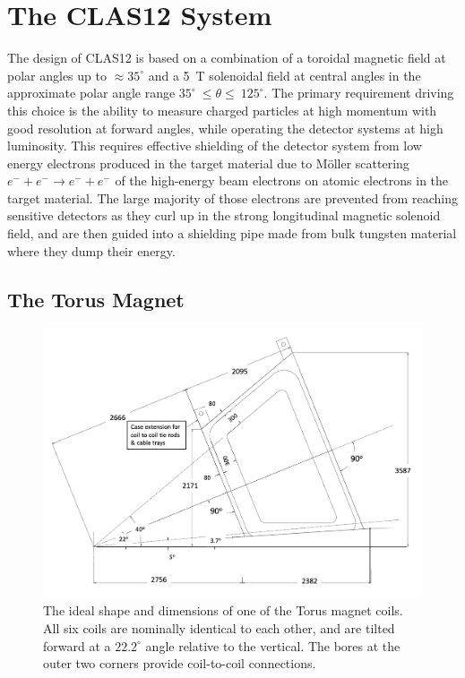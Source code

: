 \documentclass[final,3p,twocolumn]{elsarticle}
\begin{document}
\section{The CLAS12 System}

The design of CLAS12 is based on a combination of a toroidal magnetic field at polar angles up to $\approx 35^\circ$ and
a 5~T solenoidal field at central angles in the approximate polar angle range $35^\circ~\le \theta \le~125^\circ$. The
primary requirement driving this choice is the ability to measure charged particles at high momentum with good resolution
at forward angles, while operating the detector systems at high luminosity. This requires effective shielding of the
detector system from low energy electrons produced in the target material due to M\"oller scattering
$e^- + e^- \to e^- + e^-$ of the high-energy beam electrons on atomic electrons in the target material. The large majority
of those electrons are prevented from reaching sensitive detectors as they curl up in the strong longitudinal magnetic
solenoid field, and are then guided into a shielding pipe made from bulk tungsten material where they dump their energy. 

\subsection{The Torus Magnet}
\label{torus}

\begin{figure}[htbp!]
\centerline{\includegraphics[width=1.70\columnwidth]{clas12_desired.png}}
\caption{The ideal shape and dimensions of one of the Torus magnet coils. All six coils are nominally identical to each
other, and are tilted forward at a $22.2^\circ$ angle relative to the vertical. The bores at the outer two corners
provide coil-to-coil connections.}
\label{coil-shape}
\end{figure}
\end{document}
